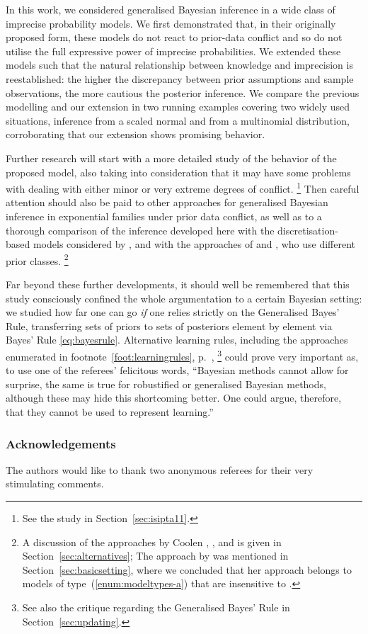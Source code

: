 In this work, we considered generalised Bayesian inference
in a wide class of imprecise probability models. We first
demonstrated that, in their originally proposed form, these models
do not react to prior-data conflict and so do not utilise
the full expressive power of imprecise probabilities. We
extended these models such that the natural relationship between
knowledge and imprecision is reestablished: the higher the
discrepancy between prior assumptions and sample observations, the
more cautious the posterior inference. We compare the previous
modelling and our extension in two running examples covering two
widely used situations, inference from a scaled normal and
from a multinomial distribution, corroborating that our extension
shows promising behavior.

Further research will start with a more detailed study of the behavior of the proposed model,
also taking into consideration that it may have some problems
with dealing with either minor or very extreme degrees of conflict.%
\footnote{See the study in Section~\ref{sec:isipta11}.}
Then careful attention should also be paid to
other approaches for generalised Bayesian inference in exponential
families \parencite{1993:coolen, 1997:boratynska} under prior data
conflict, as well as to a thorough comparison of the inference
developed here with the discretisation-based models considered by
\textcite{2005:whitcomb}, and with the approaches of \textcite{1991:pericchi}
and \textcite{1994:coolen}, who use different prior classes.%
\footnote{A discussion of the approaches by Coolen \parencite*{1993:coolen,1994:coolen},
\textcite{2005:whitcomb}, and \textcite{1991:pericchi} is given in Section~\ref{sec:alternatives};
The approach by \textcite{1997:boratynska} was mentioned in
Section~\ref{sec:basicsetting}, where we concluded that her approach
belongs to models of type~(\ref{enum:modeltypes-a}) that are insensitive to \pdc.}

Far beyond these further developments, it should well be
remembered that this study consciously confined the whole
argumentation to a certain Bayesian setting: we studied how far
one can go \emph{if} one relies strictly on the Generalised Bayes'
Rule, transferring sets of priors to sets of posteriors element by
element via Bayes' Rule \eqref{eq:bayesrule}. Alternative learning
rules, including the approaches enumerated in footnote~\ref{foot:learningrules}, p.~\pageref{foot:learningrules},%
\footnote{See also the critique regarding the Generalised Bayes' Rule in Section~\ref{sec:updating}.}
could prove very important as, to use one of the referees'
felicitous words, ``Bayesian methods cannot allow for surprise, the same is
true for robustified or generalised Bayesian methods, although these
may hide this shortcoming better. One could argue, therefore, that
they cannot be used to represent learning.''

\subsubsection*{Acknowledgements}
The authors would like to thank two anonymous referees for their very stimulating comments.







